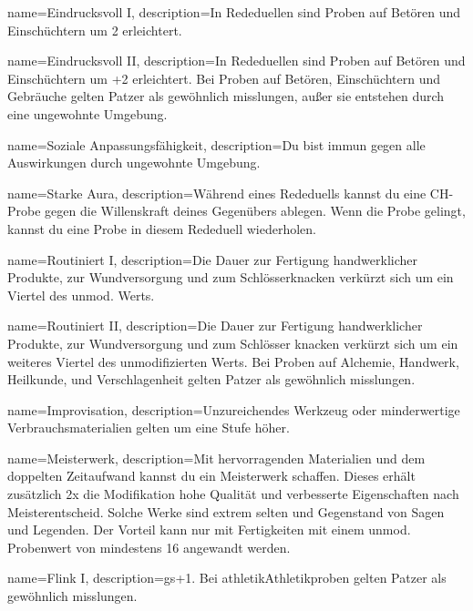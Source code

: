 {
    name={Eindrucksvoll I},
    description={In Rededuellen sind Proben auf Betören und Einschüchtern um 2 erleichtert.}}

{
    name={Eindrucksvoll II},
    description={In Rededuellen sind Proben auf Betören und Einschüchtern um +2 erleichtert. Bei Proben auf Betören, Einschüchtern und Gebräuche gelten Patzer als gewöhnlich misslungen, außer sie entstehen durch eine ungewohnte Umgebung.}}

{
    name={Soziale Anpassungsfähigkeit},
    description={Du bist immun gegen alle Auswirkungen durch ungewohnte Umgebung.}}

{
    name={Starke Aura},
    description={Während eines Rededuells kannst du eine CH-Probe gegen die Willenskraft deines Gegenübers ablegen. Wenn die Probe gelingt, kannst du eine Probe in diesem Rededuell wiederholen.}}


{
    name={Routiniert I},
    description={Die Dauer zur Fertigung handwerklicher Produkte, zur Wundversorgung und zum Schlösserknacken verkürzt sich um ein Viertel des unmod. Werts.}}

{
    name={Routiniert II},
    description={Die Dauer zur Fertigung handwerklicher Produkte, zur Wundversorgung und zum Schlösser knacken verkürzt sich um ein weiteres Viertel des unmodifizierten Werts. Bei Proben auf Alchemie, Handwerk, Heilkunde, und Verschlagenheit gelten Patzer als gewöhnlich misslungen.}}

{
    name={Improvisation},
    description={Unzureichendes Werkzeug oder minderwertige
Verbrauchsmaterialien gelten um eine Stufe höher.}}

{
    name={Meisterwerk},
    description={Mit hervorragenden Materialien und dem doppelten Zeitaufwand kannst du ein Meisterwerk schaffen. Dieses erhält zusätzlich 2x die Modifikation hohe Qualität und verbesserte Eigenschaften nach Meisterentscheid. Solche Werke sind extrem selten und Gegenstand von Sagen und Legenden. Der Vorteil kann nur mit Fertigkeiten mit einem unmod. Probenwert von mindestens 16 angewandt werden.}}

{
    name={Flink I},
    description={\gls{gs}+1. Bei \gls{athletik}{Athletikproben} gelten Patzer als gewöhnlich misslungen.}}

